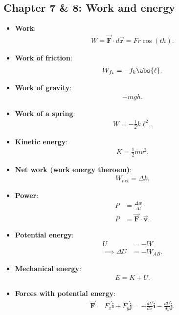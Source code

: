 \documentclass{report}
\begin{document}
    \subsection{Chapter 7 \& 8: Work and energy}
    \begin{itemize}
        \item \textbf{Work}:
            \begin{align*}
                W = \vec{\mathbf{F}} \cdot d\vec{\mathbf{r}} = Fr\cos{\left(th\right)}
            .\end{align*}
        \item \textbf{Work of friction}:
            \begin{align*}
                W_{f_{k}} = -f_{k}\abs{\ell}
            .\end{align*}
        \item \textbf{Work of gravity}:
            \begin{align*}
                -mgh
            .\end{align*}
        \item \textbf{Work of a spring}:
            \begin{align*}
                W = -\frac{1}{2}k\ell^{2}
            .\end{align*}
        \item \textbf{Kinetic energy}:
            \begin{align*}
                K = \frac{1}{2}mv^{2}
            .\end{align*}
        \item \textbf{Net work (work energy theroem)}:
            \begin{align*}
                W_{net} = \Delta k
            .\end{align*}
        \item \textbf{Power}:
            \begin{align*}
                P &= \frac{\Delta w}{\Delta t} \\
                P &= \vec{\mathbf{F}} \cdot \vec{\mathbf{v}}
            .\end{align*}
        \item \textbf{Potential energy}:
            \begin{align*}
                U &= -W \\
                \implies  \Delta U &= -W_{AB}
            .\end{align*}
        \item \textbf{Mechanical energy}:
            \begin{align*}
                E = K + U
            .\end{align*}
        \item \textbf{Forces with potential energy}:
            \begin{align*}
                \vec{\mathbf{F}} = F_{x}\hat{\mathbf{i}} + F_{y}\hat{\mathbf{j}} = -\frac{dU}{dx}\hat{\mathbf{i}} - \frac{dU}{dy}\hat{\mathbf{j}}
            .\end{align*}
    \end{itemize}
\end{document}
